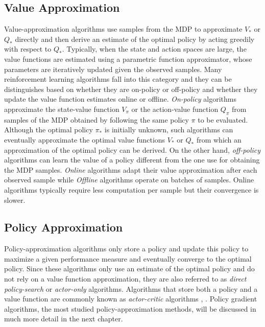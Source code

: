 \subsection{Value Approximation}
Value-approximation algorithms use samples from the MDP to approximate $V_*$ or $Q_*$ directly and then derive an estimate of the optimal policy by acting greedily with respect to $Q_*$. Typically, when the state and action spaces are large, the value functions are estimated using a parametric function approximator, whose parameters are iteratively updated given the observed samples. Many reinforcement learning algorithms fall into this category and they can be distinguishes based on whether they are on-policy or off-policy and whether they update the value function estimates online or offline. \emph{On-policy} algorithms approximate the state-value function $V_\pi$ or the action-value function $Q_\pi$ from samples of the MDP obtained by following the same policy $\pi$ to be evaluated. Although the optimal policy $\pi_*$ is initially unknown, such algorithms can eventually approximate the optimal value functions $V_*$ or $Q_*$ from which an approximation of the optimal policy can be derived. On the other hand, \emph{off-policy} algorithms can learn the value of a policy different from the one use for obtaining the MDP samples. \emph{Online} algorithms adapt their value approximation after each observed sample while \emph{Offline} algorithms operate on batches of samples. Online algorithms typically require less computation per sample but their convergence is slower. 

\subsection{Policy Approximation}
Policy-approximation algorithms only store a policy and update this policy to maximize a given performance measure and eventually converge to the optimal policy. Since these algorithms only use an estimate of the optimal policy and do not rely on a value function approximation, they are also referred to as \emph{direct policy-search} or \emph{actor-only} algorithms. Algorithms that store both a policy and a value function are commonly known as \emph{actor-critic} algorithms \cite{sutton1999policy}, \cite{konda1999actor}. Policy gradient algorithms, the most studied policy-approximation methods, will be discussed in much more detail in the next chapter. 





